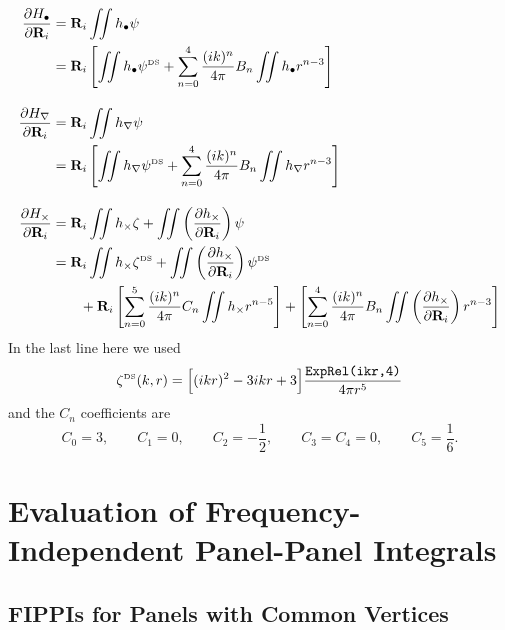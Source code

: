 \documentclass[dvips,letterpaper]{article}
\begin{document}
\begin{align*}
  \frac{\partial H_\bullet}{\partial \mathbf{R}_i}
&= \mathbf{R}_i \iint h_\bullet \psi  
\\
&= \mathbf{R}_i \left[ \iint h_{\bullet} \psi^{\hbox{\tiny{DS}}}
                 +\sum_{n=0}^4 \frac{(ik)^n}{4\pi} B_n 
                  \iint h_{\bullet} r^{n-3}
           \right]
\\[10pt]
  \frac{\partial H_\nabla}{\partial \mathbf{R}_i}
&= \mathbf{R}_i \iint h_\nabla \psi  
\\
&= \mathbf{R}_i \left[ \iint h_{\nabla} \psi^{\hbox{\tiny{DS}}}
                 +\sum_{n=0}^4 \frac{(ik)^n}{4\pi} B_n 
                  \iint h_{\nabla } r^{n-3}
           \right]
\\[10pt]
  \frac{\partial H_\times}{\partial \mathbf{R}_i}
&=   \mathbf{R}_i \iint h_\times \zeta
   + \iint \left( \frac{\partial h_\times}{\partial \mathbf{R}_i}\right) \psi
\\
&= \mathbf{R}_i \iint h_{\times} \zeta^{\hbox{\tiny{DS}}}
    +\iint \left(\frac{\partial h_\times}{\partial \mathbf{R}_i}\right)\psi^{\hbox{\tiny{DS}}}   
\\ 
&\qquad
   +\mathbf{R}_i \left[ \sum_{n=0}^5 \frac{(ik)^n}{4\pi} C_n 
                   \iint h_{\times } r^{n-5}
            \right]
   + \left[ \sum_{n=0}^4 \frac{(ik)^n}{4\pi} B_n 
            \iint \left( \frac{\partial h_{\times}}{\partial \mathbf{R}_i}\right) r^{n-3}
     \right]
\end{align*}
In the last line here we used
$$ \zeta^{\hbox{\tiny{DS}}}(k, r) = 
   \Big[ (ikr)^2 -3ikr + 3\Big]\frac{\texttt{ExpRel(ikr,4)}}{4\pi r^5} 
$$
and the $C_n$ coefficients are 
$$ C_0=3, \qquad C_1=0, \qquad C_2=-\frac{1}{2}, 
   \qquad C_3=C_4=0, \qquad C_5=\frac{1}{6}.
$$

\newpage
\section{Evaluation of Frequency-Independent Panel-Panel Integrals}

\subsection{FIPPIs for Panels with Common Vertices}
\end{document}
